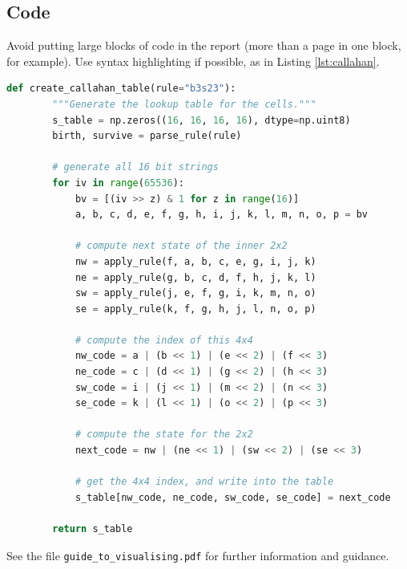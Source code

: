 \documentclass{l4proj}
\begin{document}
\subsection{Code}

Avoid putting large blocks of code in the report (more than a page in one block, for example). Use syntax highlighting if possible, as in Listing \ref{lst:callahan}.

\begin{lstlisting}[language=python, float, caption={The algorithm for packing the $3\times 3$ outer-totalistic binary CA successor rule into a 
    $16\times 16\times 16\times 16$ 4 bit lookup table, running an equivalent, notionally 16-state $2\times 2$ CA.}, label=lst:callahan]
    def create_callahan_table(rule="b3s23"):
        """Generate the lookup table for the cells."""        
        s_table = np.zeros((16, 16, 16, 16), dtype=np.uint8)
        birth, survive = parse_rule(rule)

        # generate all 16 bit strings
        for iv in range(65536):
            bv = [(iv >> z) & 1 for z in range(16)]
            a, b, c, d, e, f, g, h, i, j, k, l, m, n, o, p = bv

            # compute next state of the inner 2x2
            nw = apply_rule(f, a, b, c, e, g, i, j, k)
            ne = apply_rule(g, b, c, d, f, h, j, k, l)
            sw = apply_rule(j, e, f, g, i, k, m, n, o)
            se = apply_rule(k, f, g, h, j, l, n, o, p)

            # compute the index of this 4x4
            nw_code = a | (b << 1) | (e << 2) | (f << 3)
            ne_code = c | (d << 1) | (g << 2) | (h << 3)
            sw_code = i | (j << 1) | (m << 2) | (n << 3)
            se_code = k | (l << 1) | (o << 2) | (p << 3)

            # compute the state for the 2x2
            next_code = nw | (ne << 1) | (sw << 2) | (se << 3)

            # get the 4x4 index, and write into the table
            s_table[nw_code, ne_code, sw_code, se_code] = next_code

        return s_table

\end{lstlisting}

See the file \texttt{guide\_to\_visualising.pdf} for further information and guidance.
\end{document}
